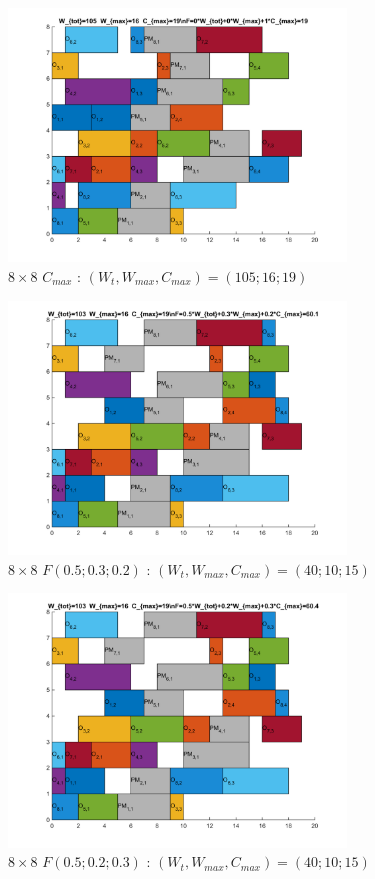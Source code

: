 \documentclass[10pt,a4paper]{scrartcl}
\begin{document}
\begin{figure}
  \centering
  \includegraphics[width=0.8\textwidth]{img/results8x8_Cmax.png}
  \caption{$8 \times 8$ $C_{max}$ : $(W_t, W_{max}, C_{max}) = (105; 16; 19)$}
\end{figure}
\begin{figure}
  \centering
  \includegraphics[width=0.8\textwidth]{img/results8x8_F050302.png}
  \caption{$8 \times 8$ $F(0.5;0.3;0.2)$ : $(W_t, W_{max}, C_{max}) = (40; 10; 15)$}
\end{figure}
\begin{figure}
  \centering
  \includegraphics[width=0.8\textwidth]{img/results8x8_F050203.png}
  \caption{$8 \times 8$ $F(0.5;0.2;0.3)$ : $(W_t, W_{max}, C_{max}) = (40; 10; 15)$}
\end{figure}
\end{document}
